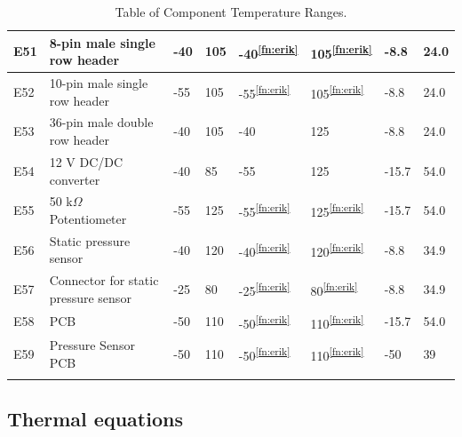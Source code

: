 \documentclass[a4paper,12pt,oneside]{article}
\begin{document}
\begin{appendices}
\begin{longtable}{|m{1cm}|m{3.5cm}|m{1.3cm}|m{1.3cm}|m{1.4cm}|m{1.3cm}|m{1.3cm}|m{1.3cm}|}
E51 & 8-pin male single row header& -40 & 105 & -40\textsuperscript{\ref{fn:erik}} & 105\textsuperscript{\ref{fn:erik}} & -8.8 & 24.0  \\ \hline
E52 & 10-pin male single row header & -55 & 105 & -55\textsuperscript{\ref{fn:erik}} & 105\textsuperscript{\ref{fn:erik}} & -8.8 & 24.0  \\ \hline
E53 & 36-pin male double row header & -40 & 105 & -40 & 125 & -8.8 & 24.0  \\ \hline
E54 & 12 V DC/DC converter & -40 & 85 & -55 & 125 & -15.7 & 54.0  \\ \hline
E55 & 50 k$\Omega$ Potentiometer & -55 & 125 & -55\textsuperscript{\ref{fn:erik}} & 125\textsuperscript{\ref{fn:erik}} & -15.7 & 54.0  \\ \hline
E56 & Static pressure sensor & -40 & 120 & -40\textsuperscript{\ref{fn:erik}} & 120\textsuperscript{\ref{fn:erik}} &  -8.8 & 34.9 \\ \hline
E57 & Connector for static pressure sensor & -25 & 80 & -25\textsuperscript{\ref{fn:erik}} & 80\textsuperscript{\ref{fn:erik}} &  -8.8 & 34.9 \\ \hline
E58 & PCB & -50 & 110 & -50\textsuperscript{\ref{fn:erik}} & 110\textsuperscript{\ref{fn:erik}} & -15.7 & 54.0 \\ \hline
E59 & Pressure Sensor PCB & -50 & 110 & -50\textsuperscript{\ref{fn:erik}} & 110\textsuperscript{\ref{fn:erik}} & -50 & 39 \\ \hline


\caption{Table of Component Temperature Ranges.}
\label{tab:thermal-table}
\end{longtable}
\raggedbottom










\raggedbottom

\subsection{Thermal equations}


\end{appendices}
\end{document}
